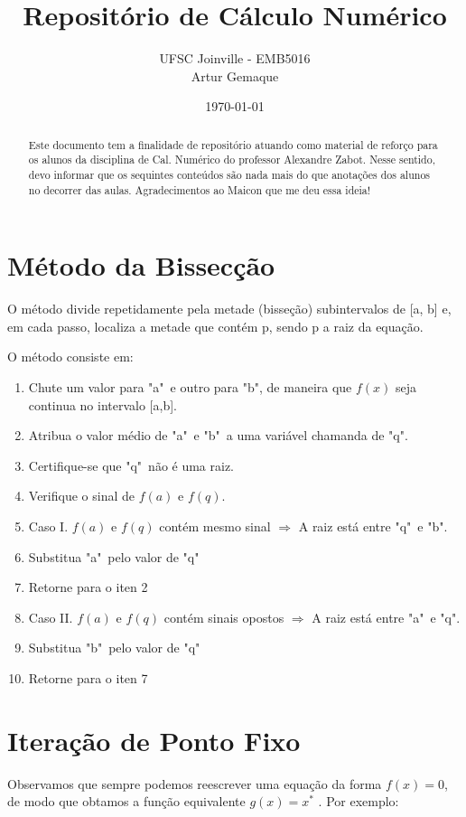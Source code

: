 \documentclass{article}
\title{\textbf{Repositório de Cálculo Numérico}}
\author{UFSC Joinville - EMB5016 \\ Artur Gemaque}
\date{\today}
\begin{document}
\maketitle

\begin{abstract}
    Este documento tem a finalidade de repositório atuando como material de reforço 
    para os alunos da disciplina de Cal. Numérico do professor Alexandre Zabot. Nesse sentido, 
    devo informar que os sequintes conteúdos são nada mais do que anotações 
    dos alunos no decorrer das aulas. Agradecimentos ao Maicon que me deu essa ideia!
\end{abstract}

\begin{multicols}{2}
\section{Método da Bissecção}
    O método divide repetidamente pela metade (bisseção) subintervalos de [a, b] e, em cada
    passo, localiza a metade que contém p, sendo p a raiz da equação.

    O método consiste em: 
    \begin{enumerate}
        \item Chute um valor para "a"\ e outro para "b", de maneira que $ f(x) $ seja continua no intervalo [a,b].
        \item Atribua o valor médio de "a"\ e "b"\ a uma variável chamanda de "q".
        \item Certifique-se que "q"\ não é uma raiz.
        \item Verifique o sinal de $ f(a) $ e $ f(q) $.
        \item Caso I. $ f(a) $ e $ f(q) $ contém mesmo sinal $\Longrightarrow $ A raiz está entre "q"\ e "b". 
        \item Substitua "a"\ pelo valor de "q"
        \item Retorne para o iten 2
        \item Caso II. $ f(a) $ e $ f(q) $ contém sinais opostos $\Longrightarrow $ A raiz está entre "a"\ e "q". 
        \item Substitua "b"\ pelo valor de "q"
        \item Retorne para o iten 7
    \end{enumerate}

\section{Iteração de Ponto Fixo}
    Observamos que sempre podemos reescrever uma equação da forma $ f(x) = 0 $, de modo que obtamos a função equivalente $ g(x) = x^* $ 
    . Por exemplo:


\end{multicols}
\end{document}
